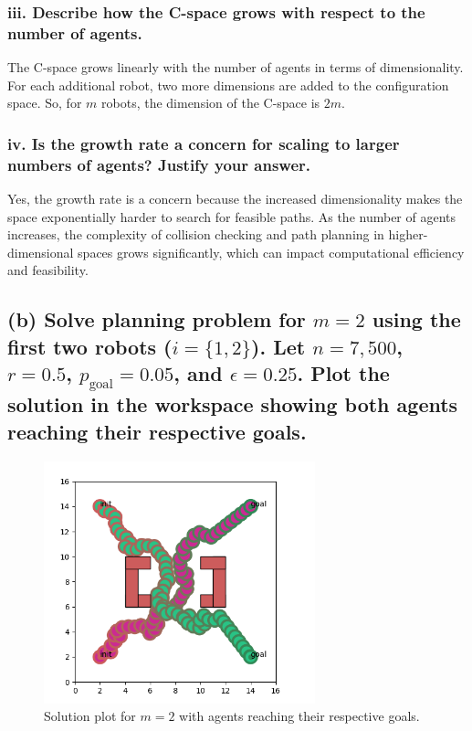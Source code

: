 \documentclass{article}
\begin{document}
\subsubsection*{iii. Describe how the C-space grows with respect to the number of agents.}

The C-space grows linearly with the number of agents in terms of dimensionality. For each additional robot, two more dimensions are added to the configuration space. So, for \(m\) robots, the dimension of the C-space is \(2m\).

\subsubsection*{iv. Is the growth rate a concern for scaling to larger numbers of agents? Justify your answer.}

Yes, the growth rate is a concern because the increased dimensionality makes the space exponentially harder to search for feasible paths. As the number of agents increases, the complexity of collision checking and path planning in higher-dimensional spaces grows significantly, which can impact computational efficiency and feasibility.

\subsection*{(b) Solve planning problem for \(m = 2\) using the first two robots (\(i = \{1, 2\}\)).
Let \( n = 7,500 \), \( r = 0.5 \), \( p_{\text{goal}} = 0.05 \), and \( \epsilon = 0.25 \). Plot the solution in the workspace showing \textbf{both} agents reaching their respective goals.
}

\begin{figure}[H]
    \centering
    \includegraphics[width=0.7\textwidth]{partBPlot.png} 
    \caption{Solution plot for \(m = 2\) with agents reaching their respective goals.}
    \label{fig:partBPlot}
\end{figure}
\end{document}
